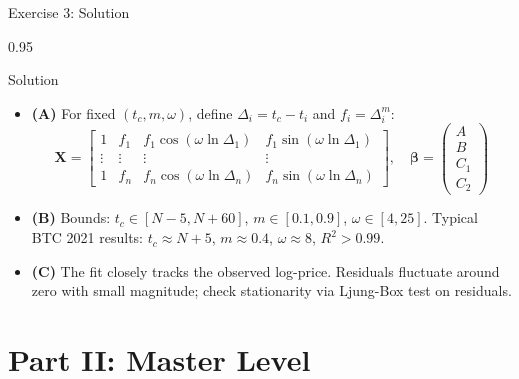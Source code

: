 \documentclass[9pt, aspectratio=169, t]{beamer}
\begin{document}
\begin{frame}{Exercise 3: Solution}
    \begin{cminipage}{0.95\textwidth}
    \begin{exampleblock}{Solution}
        {\footnotesize
        \begin{itemize}\setlength{\itemsep}{3pt}
            \item \textcolor{MainBlue}{\textbf{(A)}} For fixed $(t_c, m, \omega)$, define $\Delta_i = t_c - t_i$ and $f_i = \Delta_i^m$:
            \[
                \mathbf{X} = \begin{bmatrix} 1 & f_1 & f_1\cos(\omega\ln\Delta_1) & f_1\sin(\omega\ln\Delta_1) \\ \vdots & \vdots & \vdots & \vdots \\ 1 & f_n & f_n\cos(\omega\ln\Delta_n) & f_n\sin(\omega\ln\Delta_n) \end{bmatrix}, \quad \boldsymbol{\beta} = \begin{pmatrix} A \\ B \\ C_1 \\ C_2 \end{pmatrix}
            \]
            \item \textcolor{MainBlue}{\textbf{(B)}} Bounds: $t_c \in [N{-}5, N{+}60]$, $m \in [0.1, 0.9]$, $\omega \in [4, 25]$. Typical BTC 2021 results: $t_c \approx N + 5$, $m \approx 0.4$, $\omega \approx 8$, $R^2 > 0.99$.
            \item \textcolor{MainBlue}{\textbf{(C)}} The fit closely tracks the observed log-price. Residuals fluctuate around zero with small magnitude; check stationarity via Ljung-Box test on residuals.
        \end{itemize}
        }
    \end{exampleblock}
    \end{cminipage}
\end{frame}

\section{Part II: Master Level}
\end{document}
